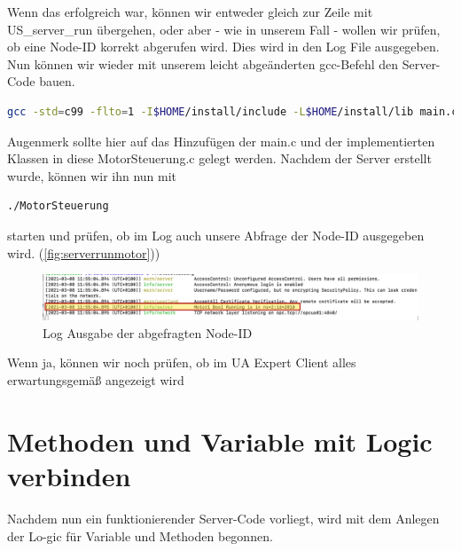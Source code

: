 	Wenn das erfolgreich war, können wir entweder gleich zur Zeile mit US\_server\_run übergehen, oder aber - wie in unserem Fall - wollen wir prüfen, ob eine Node-ID korrekt abgerufen wird. Dies wird in den Log File ausgegeben.
	Nun können wir wieder mit unserem leicht abgeänderten gcc-Befehl den Server-Code bauen.
	\begin{lstlisting}[language=Bash]
	gcc -std=c99 -flto=1 -I$HOME/install/include -L$HOME/install/lib main.c MotorSteuerung.c -lopen62541 -lmbedtls -lmbedx509 -lmbedcrypto -o MotorSteuerung
\end{lstlisting}
	Augenmerk sollte hier auf das Hinzufügen der main.c und der implementierten Klassen in diese MotorSteuerung.c gelegt werden.
	Nachdem der Server erstellt wurde, können wir ihn nun mit
	\begin{lstlisting}[language=Bash]
	./MotorSteuerung
\end{lstlisting}
	starten und prüfen, ob im Log auch unsere Abfrage der Node-ID ausgegeben wird. (\autoref{fig:serverrunmotor}))
\begin{figure}[H]
	\centering
	\includegraphics[width=1\linewidth]{abb/ServerRunMotor}
	\caption{Log Ausgabe der abgefragten Node-ID}
	\label{fig:serverrunmotor}
\end{figure}

Wenn ja, können wir noch prüfen, ob im UA Expert Client alles erwartungsgemäß angezeigt wird

\section{Methoden und Variable mit Logic verbinden}
Nachdem nun ein funktionierender Server-Code vorliegt, wird mit dem Anlegen der Lo-gic für Variable und Methoden begonnen.

